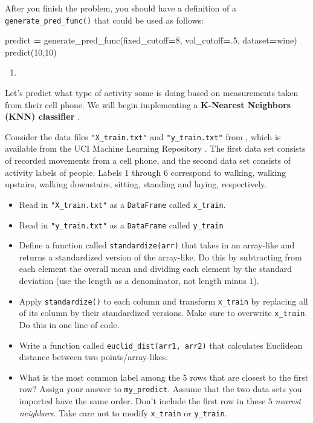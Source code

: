 \documentclass[
  12pt,
  krantz2]{krantz}
\makeatletter
\newenvironment{Shaded}{\begin{snugshade}}{\end{snugshade}}
\newcommand{\DecValTok}[1]{\textcolor[rgb]{0.06,0.06,0.06}{#1}}
\newcommand{\FloatTok}[1]{\textcolor[rgb]{0.06,0.06,0.06}{#1}}
\newcommand{\NormalTok}[1]{#1}
\newcommand{\OperatorTok}[1]{\textcolor[rgb]{0.43,0.43,0.43}{\textbf{#1}}}
\providecommand{\tightlist}{%
  \setlength{\itemsep}{0pt}\setlength{\parskip}{0pt}}
\newenvironment{kframe}{%
\medskip{}
\setlength{\fboxsep}{.8em}
 \def\at@end@of@kframe{}%
 \ifinner\ifhmode%
  \def\at@end@of@kframe{\end{minipage}}%
  \begin{minipage}{\columnwidth}%
 \fi\fi%
 \def\FrameCommand##1{\hskip\@totalleftmargin \hskip-\fboxsep
 \colorbox{shadecolor}{##1}\hskip-\fboxsep
     \hskip-\linewidth \hskip-\@totalleftmargin \hskip\columnwidth}%
 \MakeFramed {\advance\hsize-\width
   \@totalleftmargin\z@ \linewidth\hsize
   \@setminipage}}%
 {\par\unskip\endMakeFramed%
 \at@end@of@kframe}
\renewenvironment{Shaded}{\begin{kframe}}{\end{kframe}}
\makeatother
\begin{document}
After you finish the problem, you should have a definition of a \texttt{generate\_pred\_func()} that could be used as follows:

\begin{Shaded}
\begin{Highlighting}[]
\NormalTok{predict }\OperatorTok{=}\NormalTok{ generate\_pred\_func(fixed\_cutoff}\OperatorTok{=}\DecValTok{8}\NormalTok{, vol\_cutoff}\OperatorTok{=}\FloatTok{.5}\NormalTok{, dataset}\OperatorTok{=}\NormalTok{wine)}
\NormalTok{predict(}\DecValTok{10}\NormalTok{,}\DecValTok{10}\NormalTok{)}
\end{Highlighting}
\end{Shaded}

\begin{enumerate}
\def\labelenumi{\arabic{enumi}.}
\setcounter{enumi}{2}
\tightlist
\item
\end{enumerate}

Let's predict what type of activity some is doing based on measurements taken from their cell phone. We will begin implementing a \textbf{K-Nearest Neighbors (KNN) classifier} \citep{knn1} \citep{knn2}.

Consider the data files \texttt{"X\_train.txt"} and \texttt{"y\_train.txt"} from \citep{Anguita2013APD}, which is available from the UCI Machine Learning Repository \citep{uci_data}. The first data set consists of recorded movements from a cell phone, and the second data set consists of activity labels of people. Labels \(1\) through \(6\) correspond to walking, walking upstairs, walking downstairs, sitting, standing and laying, respectively.

\begin{itemize}
\tightlist
\item
  Read in \texttt{"X\_train.txt"} as a \texttt{DataFrame} called \texttt{x\_train}.
\item
  Read in \texttt{"y\_train.txt"} as a \texttt{DataFrame} called \texttt{y\_train}
\item
  Define a function called \texttt{standardize(arr)} that takes in an array-like and returns a standardized version of the array-like. Do this by subtracting from each element the overall mean and dividing each element by the standard deviation (use the length as a denominator, not length minus \(1\)).
\item
  Apply \texttt{standardize()} to each column and transform \texttt{x\_train} by replacing all of its column by their standardized versions. Make sure to overwrite \texttt{x\_train}. Do this in one line of code.
\item
  Write a function called \texttt{euclid\_dist(arr1,\ arr2)} that calculates Euclidean distance between two points/array-likes.
\item
  What is the most common label among the 5 rows that are closest to the first row? Assign your answer to \texttt{my\_predict}. Assume that the two data sets you imported have the same order. Don't include the first row in these \(5\) \emph{nearest neighbors}. Take care not to modify \texttt{x\_train} or \texttt{y\_train}.
\end{itemize}
\end{document}
